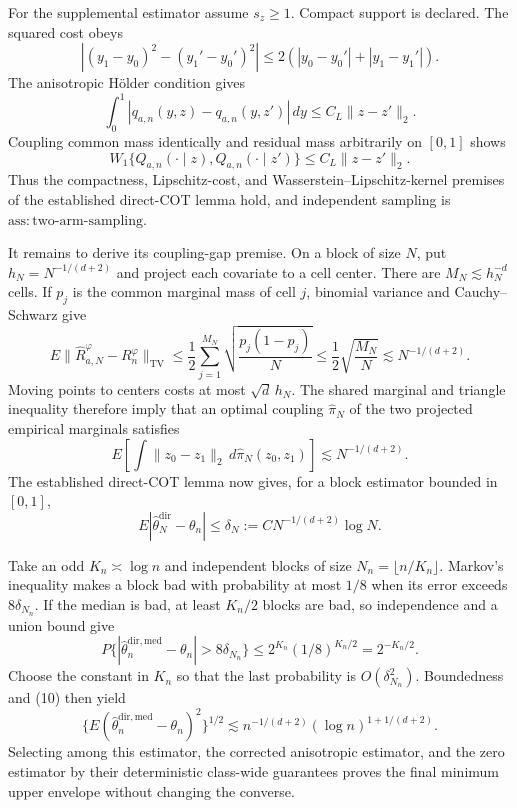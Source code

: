 For the supplemental estimator assume \(s_z\ge1\).  Compact support is declared.  The squared cost obeys
\[
|(y_1-y_0)^2-(y_1'-y_0')^2|
\le2(|y_0-y_0'|+|y_1-y_1'|).
\]
The anisotropic H\"older condition gives
\[
\int_0^1|q_{a,n}(y,z)-q_{a,n}(y,z')|\,dy\le C_L\|z-z'\|_2.
\]
Coupling common mass identically and residual mass arbitrarily on \([0,1]\) shows
\[
W_1\{Q_{a,n}(\cdot\mid z),Q_{a,n}(\cdot\mid z')\}
\le C_L\|z-z'\|_2.                                                        \tag{6}
\]
Thus the compactness, Lipschitz-cost, and Wasserstein--Lipschitz-kernel premises of the established direct-COT lemma hold, and independent sampling is \(\mathrm{ass{:}two\text{-}arm\text{-}sampling}\).

It remains to derive its coupling-gap premise.  On a block of size \(N\), put \(h_N=N^{-1/(d+2)}\) and project each covariate to a cell center.  There are \(M_N\lesssim h_N^{-d}\) cells.  If \(p_j\) is the common marginal mass of cell \(j\), binomial variance and Cauchy--Schwarz give
\[
E\|\widehat R_{a,N}^{\varphi}-R_n^{\varphi}\|_{\mathrm{TV}}
\le\frac12\sum_{j=1}^{M_N}\sqrt{\frac{p_j(1-p_j)}N}
\le\frac12\sqrt{\frac{M_N}{N}}\lesssim N^{-1/(d+2)}.                    \tag{7}
\]
Moving points to centers costs at most \(\sqrt d\,h_N\).  The shared marginal and triangle inequality therefore imply that an optimal coupling \(\widehat\pi_N\) of the two projected empirical marginals satisfies
\[
E\!\left[\int\|z_0-z_1\|_2\,d\widehat\pi_N(z_0,z_1)\right]
\lesssim N^{-1/(d+2)}.                                                     \tag{8}
\]
The established direct-COT lemma now gives, for a block estimator bounded in \([0,1]\),
\[
E|\widehat\theta_N^{\mathrm{dir}}-\theta_n|
\le\delta_N:=CN^{-1/(d+2)}\log N.                                       \tag{9}
\]

Take an odd \(K_n\asymp\log n\) and independent blocks of size \(N_n=\lfloor n/K_n\rfloor\).  Markov's inequality makes a block bad with probability at most \(1/8\) when its error exceeds \(8\delta_{N_n}\).  If the median is bad, at least \(K_n/2\) blocks are bad, so independence and a union bound give
\[
P\{|\widehat\theta_n^{\mathrm{dir,med}}-\theta_n|>8\delta_{N_n}\}
\le2^{K_n}(1/8)^{K_n/2}=2^{-K_n/2}.                                      \tag{10}
\]
Choose the constant in \(K_n\) so that the last probability is \(O(\delta_{N_n}^2)\).  Boundedness and (10) then yield
\[
\{E(\widehat\theta_n^{\mathrm{dir,med}}-\theta_n)^2\}^{1/2}
\lesssim n^{-1/(d+2)}(\log n)^{1+1/(d+2)}.
\]
Selecting among this estimator, the corrected anisotropic estimator, and the zero estimator by their deterministic class-wide guarantees proves the final minimum upper envelope without changing the converse.